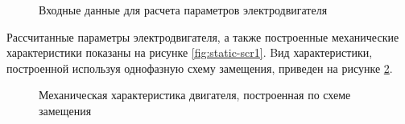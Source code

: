         \begin{figure}[th!]
            \caption{Входные данные для расчета параметров электродвигателя}
            \label{fig:static-scr2}
        \end{figure}       

        Рассчитанные параметры электродвигателя, а также построенные
        механические характеристики показаны на рисунке \ref{fig:static-scr1}.
        Bид характеристики, построенной используя однофазную
        схему замещения, приведен на рисунке \ref{fig:motor-mh1}.  %

        \begin{figure}[bh!]
            \caption{Механическая характеристика двигателя, построенная по схеме замещения}
            \label{fig:motor-mh1}
        \end{figure}

